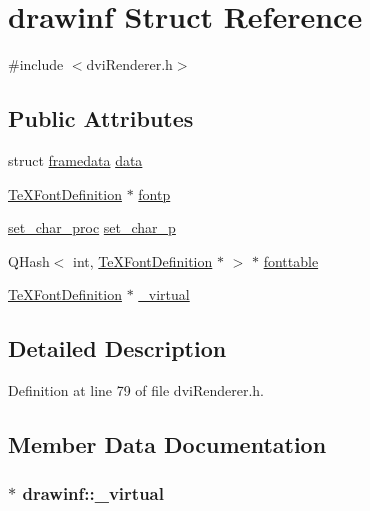 \hypertarget{structdrawinf}{\section{drawinf Struct Reference}
\label{structdrawinf}
}


{\ttfamily \#include $<$dvi\+Renderer.\+h$>$}

\subsection*{Public Attributes}
\begin{DoxyCompactItemize}
\item 
struct \hyperlink{structframedata}{framedata} \hyperlink{structdrawinf_af73f66288002f0a25c7843a534bf1340}{data}
\item 
\hyperlink{classTeXFontDefinition}{Te\+X\+Font\+Definition} $\ast$ \hyperlink{structdrawinf_a4a6ec248b5b071099ddf9b5e4f0255e2}{fontp}
\item 
\hyperlink{TeXFontDefinition_8h_a8c8fccd597b068130979c5ec1e66486c}{set\+\_\+char\+\_\+proc} \hyperlink{structdrawinf_a365a1c9700846921b83cc69e0f2780c6}{set\+\_\+char\+\_\+p}
\item 
Q\+Hash$<$ int, \hyperlink{classTeXFontDefinition}{Te\+X\+Font\+Definition} $\ast$ $>$ $\ast$ \hyperlink{structdrawinf_ac68bb33a017c34bf63f8dce71ad3ef17}{fonttable}
\item 
\hyperlink{classTeXFontDefinition}{Te\+X\+Font\+Definition} $\ast$ \hyperlink{structdrawinf_a9fef874e701c25d0d781612bd3f615a5}{\+\_\+virtual}
\end{DoxyCompactItemize}


\subsection{Detailed Description}


Definition at line 79 of file dvi\+Renderer.\+h.



\subsection{Member Data Documentation}
\hypertarget{structdrawinf_a9fef874e701c25d0d781612bd3f615a5}{
\subsubsection[{\+\_\+virtual}]{$\ast$ drawinf\+::\+\_\+virtual}}\label{structdrawinf_a9fef874e701c25d0d781612bd3f615a5}


